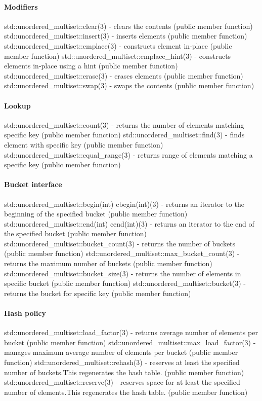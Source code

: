 \paragraph{Modifiers}
std::unordered\_multiset::clear(3) - clears the contents   (public member function)
std::unordered\_multiset::insert(3) - inserts elements   (public member function)
std::unordered\_multiset::emplace(3) - constructs element in-place   (public member function)
std::unordered\_multiset::emplace\_hint(3) - constructs elements in-place using a hint   (public member function)
std::unordered\_multiset::erase(3) - erases elements   (public member function)
std::unordered\_multiset::swap(3) - swaps the contents   (public member function)
\paragraph{Lookup}
std::unordered\_multiset::count(3) - returns the number of elements matching specific key   (public member function)
std::unordered\_multiset::find(3) - finds element with specific key  (public member function)
std::unordered\_multiset::equal\_range(3) - returns range of elements matching a specific key  (public member function)
\paragraph{Bucket interface}
std::unordered\_multiset::begin(int) cbegin(int)(3) - returns an iterator to the beginning of the specified bucket   (public member function)
std::unordered\_multiset::end(int) cend(int)(3) - returns an iterator to the end of the specified bucket   (public member function)
std::unordered\_multiset::bucket\_count(3) - returns the number of buckets  (public member function)
std::unordered\_multiset::max\_bucket\_count(3) - returns the maximum number of buckets  (public member function)
std::unordered\_multiset::bucket\_size(3) - returns the number of elements in specific bucket  (public member function)
std::unordered\_multiset::bucket(3) - returns the bucket for specific key  (public member function)
\paragraph{Hash policy}
std::unordered\_multiset::load\_factor(3) - returns average number of elements per bucket  (public member function)
std::unordered\_multiset::max\_load\_factor(3) - manages maximum average number of elements per bucket  (public member function)
std::unordered\_multiset::rehash(3) - reserves at least the specified number of buckets.This regenerates the hash table.  (public member function)
std::unordered\_multiset::reserve(3) - reserves space for at least the specified number of elements.This regenerates the hash table.  (public member function)
